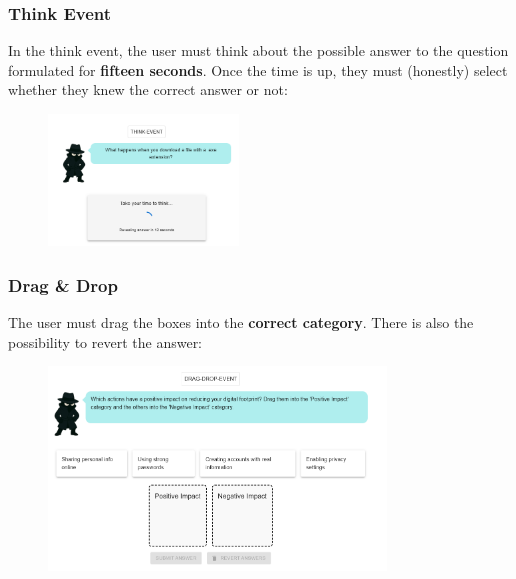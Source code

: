 \subsubsection{Think Event}
In the think event, the user must think about the possible answer to the question formulated for \textbf{fifteen seconds}. Once the
time is up, they must (honestly) select whether they knew the correct answer or not:
\begin{figure}[htbp]
    \centering
    \includegraphics[width=0.45\textwidth]{images/Think_Event.png}
    \hfill
\end{figure}
\pagebreak

\subsubsection{Drag \& Drop}
The user must drag the boxes into the \textbf{correct category}. There is also the possibility to revert the answer:
\begin{figure}[htbp]
    \centering
    \includegraphics[width=0.8\textwidth]{images/Drag_and_Drop.png}
\end{figure}

